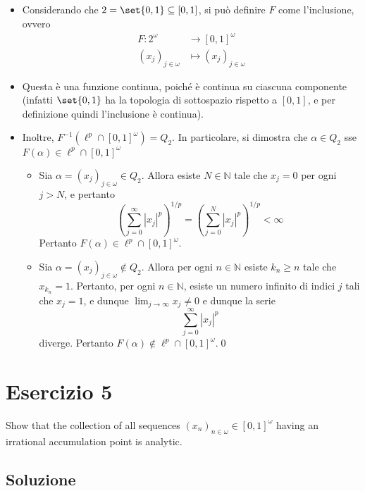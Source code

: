 \documentclass{article}
\newcommand{\1}{\mathds{1}}
\newcommand{\N}{\mathds{N}}
\begin{document}
\begin{itemize}
\item Considerando che \(2=\set{0,1} \subseteq [0,1]\), si può definire \(F\) come l'inclusione, ovvero
\begin{align*}
  F: 2^{\omega} &\longrightarrow [0,1]^{\omega}\\
  (x_{j})_{j \in \omega} &\longmapsto (x_{j})_{j \in \omega}
\end{align*}
\item Questa è una funzione continua, poiché è continua su ciascuna componente (infatti \(\set{0,1}\) ha la topologia di sottospazio rispetto a \([0,1]\), e per definizione quindi l'inclusione è continua).
\item Inoltre, \(F^{-1}\left(\ell^{p}\cap[0,1]^{\omega}\right) = Q_{2}\). In particolare, si dimostra che \(\alpha \in Q_{2}\) sse \(F(\alpha) \in \ell^{p}\cap[0,1]^{\omega}\)
\begin{itemize}
\item Sia \(\alpha = (x_{j})_{j \in \omega} \in Q_{2}\). Allora esiste \(N \in \N\) tale che \(x_{j}=0\) per ogni \(j>N\), e pertanto
\begin{equation*}
	\left(\sum_{j=0}^{\infty}|x_{j}|^{p}\right)^{1/p} = \left(\sum_{j=0}^{N} |x_{j}|^{p}\right)^{1/p}<\infty
\end{equation*}
Pertanto \(F(\alpha) \in \ell^{p}\cap[0,1]^{\omega}\).
\item Sia \(\alpha = (x_{j})_{j \in \omega} \notin Q_{2}\). Allora per ogni \(n \in \N\) esiste \(k_{n}\ge n\) tale che \(x_{k_{n}} = 1\). Pertanto, per ogni \(n \in \N\), esiste un numero infinito di indici \(j\) tali che \(x_{j}=1\), e dunque \(\lim_{j\to\infty} x_{j}\neq 0\) e dunque la serie
\begin{equation*}
	\sum_{j=0}^{\infty} |x_{j}|^{p}
\end{equation*}
diverge. Pertanto \(F(\alpha)\notin \ell^{p}\cap[0,1]^{\omega}\).\qed
\end{itemize}
\end{itemize}
\section{Esercizio 5}
\label{sec:orgdc6fc4f}

Show that the collection of all sequences \((x_n)_{n \in \omega} \in [0,1]^\omega\) having an irrational accumulation point is analytic.
\subsection{Soluzione}
\label{sec:org8569a5e}
\end{document}
